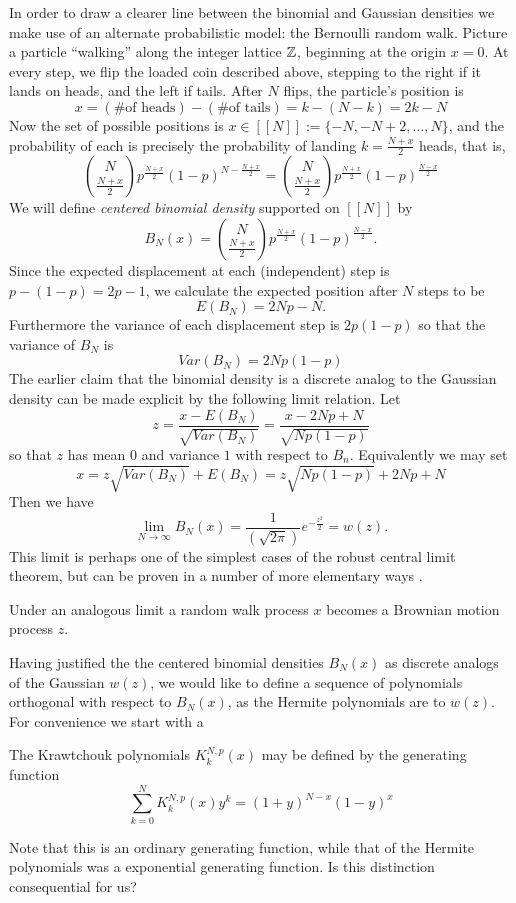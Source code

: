 In order to draw a clearer line between the binomial and Gaussian densities we make use of an alternate probabilistic model: the Bernoulli random walk. Picture a particle ``walking'' along the integer lattice $\mathbb{Z}$, beginning at the origin $x = 0$. At every step, we flip the loaded coin described above, stepping to the right if it lands on heads, and the left if tails. After $N$ flips, the particle's position is 
\[
  x = (\text{\# of heads}) - (\text{\# of tails}) = k - (N - k) = 2k - N
\]
Now the set of possible positions is $x \in [[N]] := \{-N, -N+2, \ldots, N\}$, and the probability of each is precisely the probability of landing $k = \frac{N + x}2$ heads, that is,
\[
  \binom{N}{\frac{N + x}2}p^{\frac{N + x}2}(1 - p)^{N - \frac{N + x}2}
  = \binom{N}{\frac{N + x}2}p^{\frac{N + x}2}(1 - p)^{\frac{N - x}2}
\]
We will define \emph{centered binomial density} supported on $[[N]]$ by
\[
  B_N(x) = \binom{N}{\frac{N+x}2}p^{\frac{N+x}2}(1-p)^{\frac{N-x}2}.
\]
Since the expected displacement at each (independent) step is $p - (1 - p) = 2p - 1$, we calculate the expected position after $N$ steps to be 
\[
  E(B_N) = 2Np-N.
\]
Furthermore the variance of each displacement step is $2p(1-p)$ so that the variance of $B_N$ is
\[
  Var(B_N) = 2Np(1-p)
\]
The earlier claim that the binomial density is a discrete analog to the Gaussian density can be made explicit by the following limit relation. Let \[
  z = \frac{x - E(B_N)}{\sqrt{Var(B_N)}} 
  = \frac{x - 2Np + N}{\sqrt{Np(1-p)}}
\]
so that $z$ has mean $0$ and variance $1$ with respect to $B_n$. Equivalently we may set
\[
  x = z\sqrt{Var(B_N)} + E(B_N) = z \sqrt{Np(1-p)} + 2Np + N
\]
Then we have
\[
  \lim_{N \rightarrow \infty} B_N(x) = \frac{1}{(\sqrt{2\pi})}e^{-\frac{z^2}2} = w(z).
\]
This limit is perhaps one of the simplest cases of the robust central limit theorem, but can be proven in a number of more elementary ways \cn.

\begin{remark}
  Under an analogous limit a random walk process $x$ becomes a Brownian motion process $z$. \cn
\end{remark}

Having justified the the centered binomial densities $B_N(x)$ as discrete analogs of the Gaussian $w(z)$, we would like to define a sequence of polynomials orthogonal with respect to $B_N(x)$, as the Hermite polynomials are to $w(z)$. For convenience we start with a 

\begin{definition}
  The Krawtchouk polynomials $K_k^{N,p}(x)$ may be defined by the generating function
  \[
    \sum_{k=0}^N K^{N,p}_k(x)y^k = (1 + y)^{N - x}(1 - y)^x
  \]
\end{definition}
\begin{remark}
  Note that this is an ordinary generating function, while that of the Hermite polynomials was a exponential generating function. Is this distinction consequential for us?
\end{remark}

